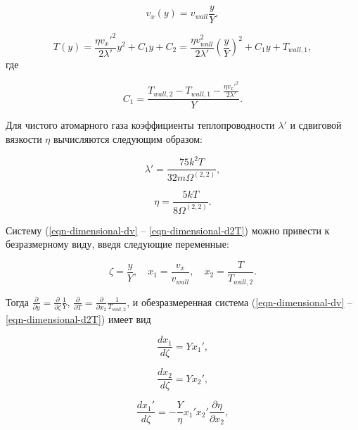 \documentclass[12pt]{article}
\begin{document}
\begin{equation}
  v_{x}(y) = v_{wall}\frac{y}{Y},
\end{equation}

\begin{equation}
  T(y) = \frac{\eta v_{x}'^2}{2\lambda'}y^2 + C_{1}y + C_{2} = \frac{\eta v_{wall}^2}{2\lambda'}\left(\frac{y}{Y}\right)^2 + C_{1}y + T_{wall,1},
\end{equation}
где

\begin{equation}
  C_{1}= \frac{T_{wall,2} - T_{wall,1} -\frac{\eta v_{x}'^2}{2\lambda'}}{Y}.
\end{equation}

Для чистого атомарного газа коэффициенты теплопроводности $\lambda'$ и сдвиговой вязкости $\eta$ вычисляются следующим образом:

\begin{equation}
  \lambda' = \frac{75k^2T}{32m\Omega^{(2,2)}},
\end{equation}

\begin{equation}
  \eta = \frac{5kT}{8\Omega^{(2,2)}}.
\end{equation}

Систему (\ref{eqn-dimensional-dv} -- \ref{eqn-dimensional-d2T}) можно привести к безразмерному виду, введя следующие переменные:

\begin{equation}
  \zeta = \frac{y}{Y},\quad x_{1} = \frac{v_{x}}{v_{wall}},\quad x_{2} = \frac{T}{T_{wall, 2}}.
\end{equation}

Тогда $\frac{\partial }{\partial y}=\frac{\partial }{\partial \zeta}\frac{1}{Y}$, $\frac{\partial }{\partial T}=\frac{\partial }{\partial x_{2}}\frac{1}{T_{wall,2}}$, и обезразмеренная система (\ref{eqn-dimensional-dv} -- \ref{eqn-dimensional-d2T}) имеет вид

\begin{equation}
  \frac{d x_{1}}{d \zeta} = Y x_{1}',\label{eqn-dimensionless-dx1}
\end{equation}

\begin{equation}
  \frac{d x_{2}}{d \zeta} = Y x_{2}',\label{eqn-dimensionless-dx1}
\end{equation}

\begin{equation}
  \frac{d x_{1}'}{d \zeta} = -\frac{Y}{\eta}x_{1}'x_{2}'\frac{\partial \eta}{\partial x_{2}},\label{eqn-dimensionless-dx21}
\end{equation}
\end{document}
